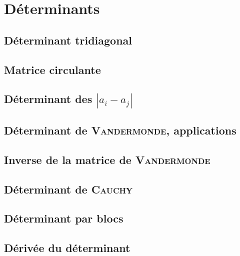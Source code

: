 \chapter{Déterminants}



\newpage

\section{Déterminant tridiagonal}


\section{Matrice circulante}


\section{Déterminant des \texorpdfstring{$|a_i - a_j|$}{|a_i - a_j|}}


\section{Déterminant de \textsc{Vandermonde}, applications}


\section{Inverse de la matrice de {\textsc{Vandermonde}}}


\section{Déterminant de \textsc{Cauchy}}


\section{Déterminant par blocs}


\section{Dérivée du déterminant}

